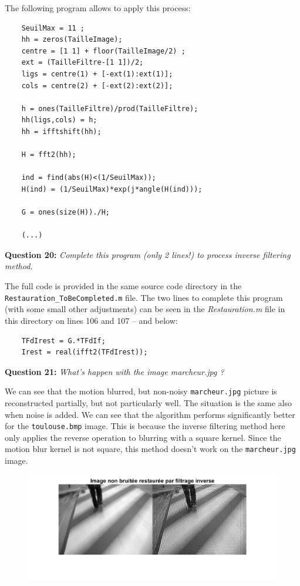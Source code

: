 The following program allows to apply this process:
\begin{lstlisting}
    SeuilMax = 11 ;
    hh = zeros(TailleImage);
    centre = [1 1] + floor(TailleImage/2) ;
    ext = (TailleFiltre-[1 1])/2;
    ligs = centre(1) + [-ext(1):ext(1)];
    cols = centre(2) + [-ext(2):ext(2)];
    
    h = ones(TailleFiltre)/prod(TailleFiltre);
    hh(ligs,cols) = h;
    hh = ifftshift(hh);
    
    H = fft2(hh);
    
    ind = find(abs(H)<(1/SeuilMax));
    H(ind) = (1/SeuilMax)*exp(j*angle(H(ind)));
    
    G = ones(size(H))./H;
    
    (...)
\end{lstlisting}


\textbf{Question 20:}
\textit{Complete this program (only 2 lines!) to process inverse ﬁltering method.}

The full code is provided in the same source code directory in the \texttt{Restauration\_ToBeCompleted.m} file. 
The two lines to complete this program (with some small other adjustments) can be seen in the \textit{Restauration.m} file in this directory on lines 106 and 107 -- and below:
\begin{lstlisting}
    TFdIrest = G.*TFdIf;
    Irest = real(ifft2(TFdIrest));
\end{lstlisting}


\textbf{Question 21:}
\textit{What’s happen with the image marcheur.jpg ?}

We can see that the motion blurred, but non-noisy \texttt{marcheur.jpg} picture is reconstructed partially, but not particularly well. The situation is the same also when noise is added. We can see that the algorithm performs significantly better for the \texttt{toulouse.bmp} image. This is because the inverse filtering method here only applies the reverse operation to blurring with a square kernel. Since the motion blur kernel is not square, this method doesn't work on the \texttt{marcheur.jpg} image.  

\begin{figure}[H]
    \centering
    \includegraphics[width=\linewidth]{Doc/Graphics/Part1/Q21a.png}
\end{figure}

